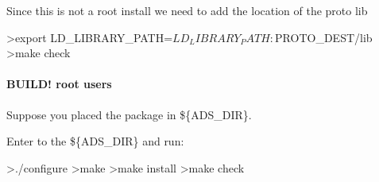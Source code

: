 Since this is not a root install we need to add the location of the proto lib \begin{DoxyVerb}>export LD_LIBRARY_PATH=$LD_LIBRARY_PATH:${PROTO_DEST}/lib
>make check
\end{DoxyVerb}


\paragraph*{B\+U\+I\+L\+D! root users}

Suppose you placed the package in \$\{A\+D\+S\+\_\+\+D\+I\+R\}.

Enter to the \$\{A\+D\+S\+\_\+\+D\+I\+R\} and run\+:

\begin{DoxyVerb}>./configure
>make
>make install
>make check\end{DoxyVerb}
 